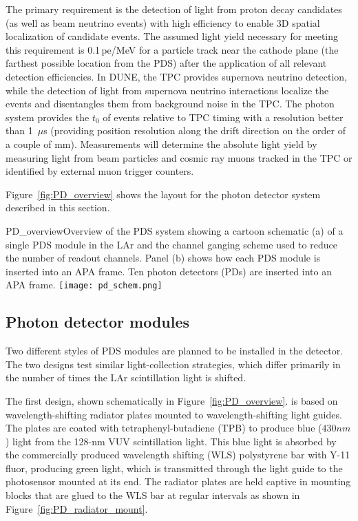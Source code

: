 The primary requirement is the detection of light from proton decay
candidates (as well as beam neutrino events) with high efficiency to
enable 3D spatial localization of candidate events. The assumed light yield necessary for
meeting this requirement is 0.1\,pe/MeV for a particle track near the cathode plane
(the farthest possible location from the PDS) after the application of all relevant detection efficiencies. In DUNE, 
the TPC  provides supernova neutrino detection, while the detection of light
from supernova neutrino interactions localize the events and disentangles
them from background noise in the TPC.
The photon system provides the $t_0$  of
events relative to TPC timing with a resolution better than 1~$\mu$s
(providing position resolution along the drift direction on the order of a couple of mm). 
Measurements %
will determine the absolute
light yield by measuring light from beam particles and cosmic ray muons
tracked in the TPC or identified by external muon trigger counters.

Figure~\ref{fig:PD_overview} shows the layout for the photon detector
system described in this section. %

\begin{cdrfigure}{PD_overview}{Overview of the PDS
    system showing a cartoon schematic (a) of a single PDS module
    in the LAr and the channel ganging scheme used to reduce the
    number of readout channels. Panel (b) shows how each PDS module
   is inserted into an APA frame. Ten photon detectors (PDs) are inserted
    into an APA frame.}
\texttt{[image: pd\_schem.png]}
\end{cdrfigure}

\subsection{Photon detector modules}

Two different styles of PDS 
modules are planned to be installed in the detector.  The two designs test similar light-collection strategies, which differ primarily in  the number of times the LAr scintillation 
light is shifted.  

The first design, shown schematically in Figure~\ref{fig:PD_overview}. is based on
wavelength-shifting radiator plates mounted to wavelength-shifting light guides.
The plates are coated 
with tetraphenyl-butadiene (TPB) to produce blue ($430nm$) light from the 128-nm VUV 
scintillation light.  
This blue light is absorbed by the commercially produced wavelength shifting (WLS)
polystyrene bar with Y-11 fluor, producing green light, which is transmitted
through the light guide to the photosensor 
mounted at its end.
The radiator plates are held captive in mounting blocks that are glued to the WLS bar
at regular intervals as shown in Figure~\ref{fig:PD_radiator_mount}.

